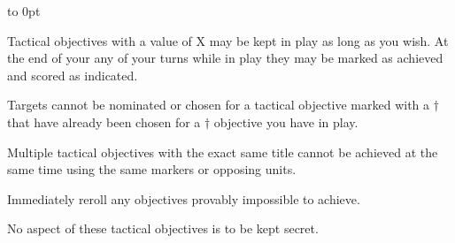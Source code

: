 \clearpage
\squelchbackground
\begin{landscape}

\vspace*{-15pt}
\centerline{}

\vspace{-24pt}
\vbox to 0pt{}

\noindent
\begin{minipage}[t][\textheight-0.25in][t]{0.5\linewidth-1em}

\vfill
\small

Tactical objectives with a value of X may be kept in play as long as
you wish.  At the end of your any of your turns while in play they may
be marked as achieved and scored as indicated.

\smallskip%
Targets cannot be nominated or chosen for a tactical objective marked
with a $\dagger$ that have already been chosen for a $\dagger$
objective you have in play.

\smallskip%
Multiple tactical objectives with the exact same title cannot be
achieved at the same time using the same markers or opposing units.
\end{minipage}
\hfill
\begin{minipage}[t][\textheight-0.25in][t]{0.5\linewidth-1em}

\vfill
\small

Immediately reroll any objectives provably impossible to achieve.

\smallskip%
No aspect of these tactical objectives is to be kept secret.
\end{minipage}

\end{landscape}

\clearpage
\restorebackground
